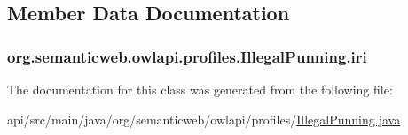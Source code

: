 \subsection{Member Data Documentation}
\hypertarget{classorg_1_1semanticweb_1_1owlapi_1_1profiles_1_1_illegal_punning_a83e7e402c399ade6ed8a894eb4005779}{
\subsubsection[{iri}]{ org.\-semanticweb.\-owlapi.\-profiles.\-Illegal\-Punning.\-iri\hspace{0.3cm}{\ttfamily [private]}}}\label{classorg_1_1semanticweb_1_1owlapi_1_1profiles_1_1_illegal_punning_a83e7e402c399ade6ed8a894eb4005779}


The documentation for this class was generated from the following file\-:\begin{DoxyCompactItemize}
\item 
api/src/main/java/org/semanticweb/owlapi/profiles/\hyperlink{_illegal_punning_8java}{Illegal\-Punning.\-java}\end{DoxyCompactItemize}
